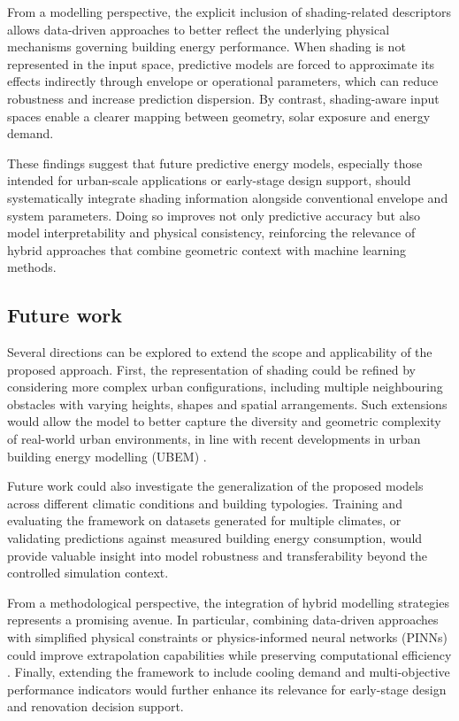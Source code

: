 \documentclass{article}
\begin{document}
From a modelling perspective, the explicit inclusion of shading-related
descriptors allows data-driven approaches to better reflect the underlying
physical mechanisms governing building energy performance. When shading is not
represented in the input space, predictive models are forced to approximate its
effects indirectly through envelope or operational parameters, which can reduce
robustness and increase prediction dispersion. By contrast, shading-aware input
spaces enable a clearer mapping between geometry, solar exposure and energy
demand.

These findings suggest that future predictive energy models, especially those
intended for urban-scale applications or early-stage design support, should
systematically integrate shading information alongside conventional envelope
and system parameters. Doing so improves not only predictive accuracy but also
model interpretability and physical consistency, reinforcing the relevance of
hybrid approaches that combine geometric context with machine learning methods.
\subsection{Future work}
Several directions can be explored to extend the scope and applicability of the
proposed approach. First, the representation of shading could be refined by
considering more complex urban configurations, including multiple neighbouring
obstacles with varying heights, shapes and spatial arrangements. Such extensions
would allow the model to better capture the diversity and geometric complexity of
real-world urban environments, in line with recent developments in urban
building energy modelling (UBEM) \cite{Ferrando2021UBEM,Ali2021UBEM}.

Future work could also investigate the generalization of the proposed models
across different climatic conditions and building typologies. Training and
evaluating the framework on datasets generated for multiple climates, or
validating predictions against measured building energy consumption, would
provide valuable insight into model robustness and transferability beyond the
controlled simulation context.

From a methodological perspective, the integration of hybrid modelling strategies
represents a promising avenue. In particular, combining data-driven approaches
with simplified physical constraints or physics-informed neural networks (PINNs)
could improve extrapolation capabilities while preserving computational
efficiency \cite{Raissi2019PINNs,Karniadakis2021PIML}. Finally, extending the
framework to include cooling demand and multi-objective performance indicators
would further enhance its relevance for early-stage design and renovation
decision support.



\end{document}
